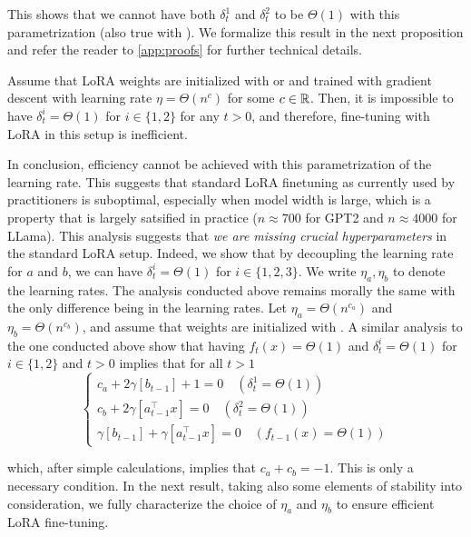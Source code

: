 This shows that we cannot have both $\delta_t^1$ and $\delta_t^2$ to be $\Theta(1)$ with this parametrization (also true with ). We formalize this result in the next proposition and refer the reader to \cref{app:proofs} for further technical details.

\begin{prop}\label{prop:inefficiency_toy}
Assume that LoRA weights are initialized with  or  and trained with gradient descent with learning rate $\eta = \Theta(n^c)$ for some $c \in \mathbb{R}$. Then, it is impossible to have $\delta_t^i = \Theta(1)$ for $i \in \{1,2\}$ for any $t>0$, and therefore, fine-tuning with LoRA in this setup is inefficient.
\end{prop}
In conclusion, efficiency cannot be achieved with this parametrization of the learning rate. This suggests that standard LoRA finetuning as currently used by practitioners is suboptimal, especially when model width is large, which is a property that is largely satsified in practice ($n\approx 700$ for GPT2 and $n\approx 4000$ for LLama). This analysis suggests that \emph{we are missing crucial hyperparameters} in the standard LoRA setup. Indeed, we show that by decoupling the learning rate for $a$ and $b$, we can have $\delta_t^i = \Theta(1)$ for $i \in \{1,2, 3\}$. We write $\eta_a, \eta_b$ to denote the learning rates. The analysis conducted above remains morally the same with the only difference being in the learning rates. Let $\eta_a = \Theta(n^{c_a})$ and $\eta_b = \Theta(n^{c_b})$, and assume that weights are initialized with . A similar analysis to the one conducted above show that having $f_t(x) = \Theta(1)$ and $\delta_t^i = \Theta(1)$ for $i \in \{1,2\}$ and $t>0$ implies that for all $t>1$
\begin{equation*}
    \begin{cases}
c_a+2\gamma[b_{t-1}] + 1 = 0 \quad (\delta^1_t = \Theta(1))\\
        c_b + 2 \gamma[a_{t-1}^\top x] = 0\quad (\delta^2_t = \Theta(1)) \\
        \gamma[b_{t-1}] + \gamma[a_{t-1}^\top x] = 0 \quad (f_{t-1}(x) = \Theta(1))
    \end{cases}
\end{equation*}



which, after simple calculations, implies that $c_a + c_b = -1$. This is only a necessary condition. In the next result, taking also some elements of stability into consideration, we fully characterize the choice of $\eta_a$ and $\eta_b$ to ensure efficient LoRA fine-tuning. 

